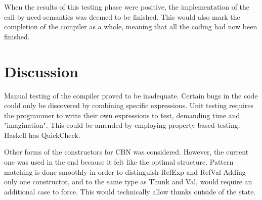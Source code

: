 When the results of this testing phase were positive, the implementation of the
call-by-need semantics was deemed to be finished. This would also mark the
completion of the compiler as a whole, meaning that all the coding had now been
finished.


\section{Discussion}

Manual testing of the compiler proved to be inadequate.
  Certain bugs in the code could only be discovered by combining specific expressions.
  Unit testing requires the programmer to write their own expressions to test,
  demanding time and "imagination".
  This could be amended by employing property-based testing. Haskell has QuickCheck.

Other forms of the constructors for CBN was considered.
  However, the current one was used in the end because it felt like the optimal structure.
  Pattern matching is done smoothly in order to distinguish RefExp and RefVal
  Adding only one constructor, and to the same type as Thunk and Val, would require an
    additional case to force. This would technically allow thunks outside of the state.



